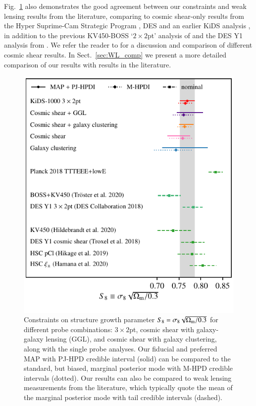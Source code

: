 Fig.~\ref{fig:S8comp} also demonstrates the good agreement between our constraints and weak lensing results from the literature, comparing to cosmic shear-only results from the Hyper Suprime-Cam Strategic Program \citep[HSC,][]{hikage/etal:2019,hamana/etal:2020}, DES \citep{troxel/etal:2018} and an earlier KiDS analysis \citep[KV450][]{hildebrandt/etal:2020}, in addition to the previous KV450-BOSS `$2\times2$pt' analysis of \citet{troester/etal:2020} and the DES Y1 \tttp analysis from \citet{abbott/etal:2018}.   We refer the reader to \citet{asgari/etal:inprep} for a discussion and comparison of different cosmic shear results.  In Sect.~\ref{sec:WL_comp} we present a more detailed comparison of our results with \tttp results in the literature.

\begin{figure}
	\begin{center}
		\includegraphics[width=\columnwidth]{Parameter_Plots/cosmology/S8_comparison_blindC}
		\caption{Constraints on structure growth parameter $S_{8} = \sigma_8 \sqrt{\Omega_{\rm m}/0.3}$ for different probe combinations: $3\times2$pt, cosmic shear with galaxy-galaxy lensing (GGL), and cosmic shear with galaxy clustering, along with the single probe analyses.   Our fiducial and preferred MAP with PJ-HPD credible interval (solid) can be compared to the standard, but biased, marginal posterior mode with M-HPD credible intervals (dotted).    Our results can also be compared to weak lensing measurements from the literature, which typically quote the mean of the marginal posterior mode with tail credible intervals (dashed). 
		\label{fig:S8comp}}
	\end{center}
\end{figure}

